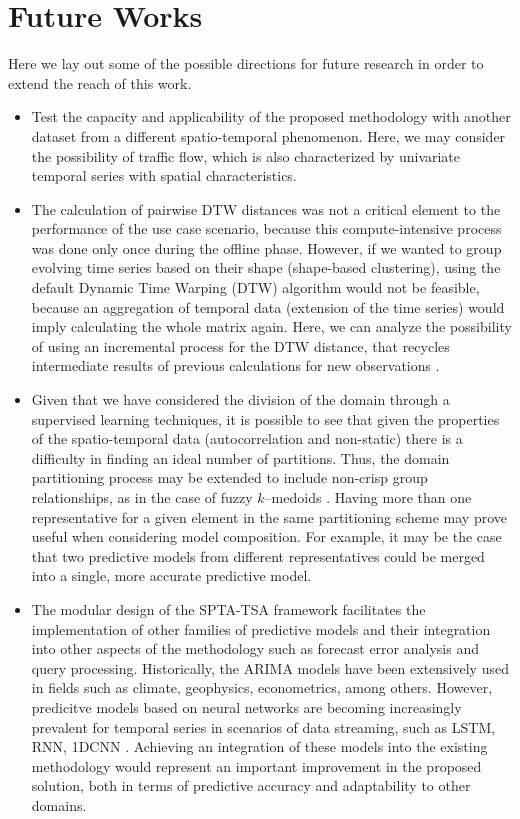 \section{Future Works}

Here we lay out some of the possible directions for future research in order to extend the reach of this work.

\begin{itemize}
    
    \item Test the capacity and applicability of the proposed methodology with another dataset from a different spatio-temporal phenomenon. Here, we may consider the possibility of traffic flow, which is also characterized by univariate temporal series with spatial characteristics. %
    
    \item The calculation of pairwise DTW distances was not a critical element to the performance of the use case scenario, because this compute-intensive process was done only once during the offline phase. However, if we wanted to group evolving time series based on their shape (shape-based clustering), using the default Dynamic Time Warping (DTW) algorithm would not be feasible, because an aggregation of temporal data (extension of the time series) would imply calculating the whole matrix again. Here, we can analyze the possibility of using an incremental process for the DTW distance, that recycles intermediate results of previous calculations for new observations \cite{Oregi2017}.
    
    \item Given that we have considered the division of the domain through a supervised learning techniques, it is possible to see that given the properties of the spatio-temporal data (autocorrelation and non-static) there is a difficulty in finding an ideal number of partitions. Thus, the domain partitioning process may be extended to include non-crisp group relationships, as in the case of fuzzy $k$--medoids \cite{Izakian2015}. Having more than one representative for a given element in the same partitioning scheme may prove useful when considering model composition. For example, it may be the case that two predictive models from different representatives could be merged into a single, more accurate predictive model.

    \item The modular design of the SPTA-TSA framework facilitates the implementation of other families of predictive models and their integration into other aspects of the methodology such as forecast error analysis and query processing. Historically, the ARIMA models have been extensively used in fields such as climate, geophysics, econometrics, among others. However, predicitve models based on neural networks are becoming increasingly prevalent for temporal series in scenarios of data streaming, such as LSTM, RNN, 1DCNN \cite{Shen2020, Torres2021}. Achieving an integration of these models into the existing methodology would represent an important improvement in the proposed solution, both in terms of predictive accuracy and adaptability to other domains.


\end{itemize}
